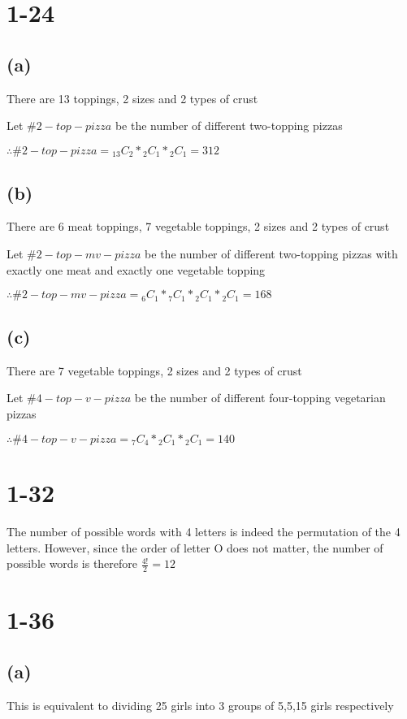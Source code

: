 \documentclass[12pt]{article}
\begin{document}
\begin{spacing}{2.0}
\section*{1-24}
\subsection*{(a)}
There are 13 toppings, 2 sizes and 2 types of crust

Let $\#2-top-pizza$ be the number of different two-topping pizzas

$\therefore \#2-top-pizza= {}_{13}C_{2}* {}_{2}C_{1}* {}_{2}C_{1}= 312$

\subsection*{(b)}
There are 6 meat toppings, 7 vegetable toppings, 2 sizes and 2 types of crust

Let $\#2-top-mv-pizza$ be the number of different two-topping pizzas with exactly one meat and exactly one vegetable topping

$\therefore \#2-top-mv-pizza= {}_{6}C_{1}*{}_{7}C_{1}* {}_{2}C_{1}* {}_{2}C_{1}=168$

\subsection*{(c)}
There are 7 vegetable toppings, 2 sizes and 2 types of crust

Let $\#4-top-v-pizza$ be the number of different four-topping vegetarian pizzas

$\therefore \#4-top-v-pizza= {}_{7}C_{4}* {}_{2}C_{1}* {}_{2}C_{1}=140$

\section*{1-32}
The number of possible words with 4 letters is indeed the permutation of the 4 letters. However, since the order of letter O does not matter, the number of possible words is therefore $\frac{4!}{2}= 12$

\section*{1-36}
\subsection*{(a)}
This is equivalent to dividing 25 girls into 3 groups of 5,5,15 girls respectively


\end{spacing}
\end{document}

